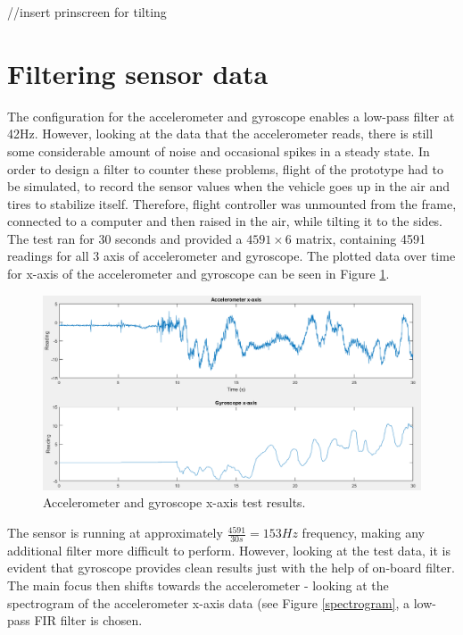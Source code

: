 //insert prinscreen for tilting 

\section{Filtering sensor data}
The configuration for the accelerometer and gyroscope enables a low-pass filter at 42Hz. However, looking at the data that the accelerometer reads, there is still some considerable amount of noise and occasional spikes in a steady state. In order to design a filter to counter these problems, flight of the prototype had to be simulated, to record the sensor values when the vehicle goes up in the air and tires to stabilize itself. Therefore, flight controller was unmounted from the frame, connected to a computer and then raised in the air, while tilting it to the sides. The test ran for 30 seconds and provided a $4591\times 6$ matrix, containing 4591 readings for all 3 axis of accelerometer and gyroscope. The plotted data over time for x-axis of the accelerometer and gyroscope can be seen in Figure \ref{dataPlot}.

\begin{figure}[H]
  \centering
    \includegraphics[width=1\textwidth]{images/MPUXPlot.png}
	\caption{Accelerometer and gyroscope x-axis test results.}
	\label{dataPlot}
\end{figure}

The sensor is running at approximately $\frac{4591}{30s} = 153Hz$ frequency, making any additional filter more difficult to perform. However, looking at the test data, it is evident that gyroscope provides clean results just with the help of on-board filter. The main focus then shifts towards the accelerometer - looking at the spectrogram of the accelerometer x-axis data (see Figure \ref{spectrogram}, a low-pass FIR filter is chosen.

